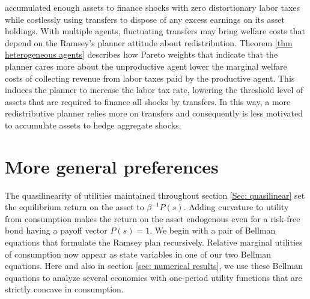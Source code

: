 \documentclass[thmsb,11pt]{article}
\begin{document}
accumulated enough assets to finance shocks with zero distortionary labor taxes while costlessly using transfers
to dispose of any excess earnings on its asset holdings. With multiple agents, fluctuating transfers  may bring welfare costs that  depend on
the Ramsey's planner attitude about  redistribution. Theorem \ref{thm heterogeneous agents} describes how Pareto weights that  indicate
that the planner cares more about the unproductive agent 
lower the marginal welfare costs of collecting revenue from labor taxes paid by the productive agent. This induces
the planner to increase the labor tax rate,
lowering the threshold level of assets that are required to finance all shocks by transfers. In this way,
a more redistributive planner relies more on transfers and consequently is less motivated  to accumulate assets to hedge aggregate shocks.

\color{black}

\section{More general preferences}
\label{Sec: more general economies}

The quasilinearity of utilities maintained throughout  section \ref{Sec: quasilinear} set  the equilibrium  return on the asset to $\beta^{-1}P(s)$.
Adding curvature to utility from consumption  makes the  return on the asset   endogenous even for a risk-free bond having a payoff vector $P(s)=1$. 
We begin with a pair of Bellman equations that formulate the  Ramsey plan recursively.  Relative marginal utilities of consumption
now appear as state variables in one of our two Bellman equations. Here  and also in section  \ref{sec: numerical results}, we  use
these Bellman equations to analyze several economies  with one-period utility functions that are strictly concave in consumption.
\end{document}
